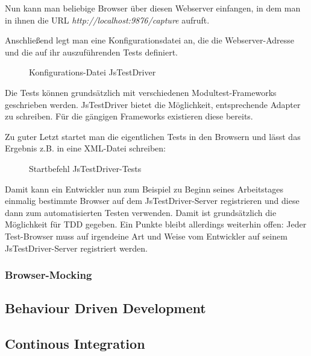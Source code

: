 Nun kann man beliebige Browser über diesen Webserver einfangen, in dem man in ihnen die URL \emph{http://localhost:9876/capture} aufruft.

Anschließend legt man eine Konfigurationsdatei an, die die Webserver-Adresse und die auf ihr auszuführenden Tests definiert.

\begin{figure}[H]
	\begin{center}
		\caption{Konfigurations-Datei JsTestDriver}
		\label{config:jstestdriver}
	\end{center}
\end{figure}

Die Tests können grundsätzlich mit verschiedenen Modultest-Frameworks geschrieben werden. JsTestDriver bietet die Möglichkeit, entsprechende Adapter zu schreiben. Für die gängigen Frameworks existieren diese bereits.

Zu guter Letzt startet man die eigentlichen Tests in den Browsern und lässt das Ergebnis z.B. in eine XML-Datei schreiben:

\begin{figure}[H]
	\begin{center}
		\caption{Startbefehl JsTestDriver-Tests}
		\label{bash:jstestdriver2}
	\end{center}
\end{figure}

Damit kann ein Entwickler nun zum Beispiel zu Beginn seines Arbeitstages einmalig bestimmte Browser auf dem JsTestDriver-Server registrieren und diese dann zum automatisierten Testen verwenden. Damit ist grundsätzlich die Möglichkeit für \ac{TDD} gegeben. Ein Punkte bleibt allerdings weiterhin offen: Jeder Test-Browser muss auf irgendeine Art und Weise vom Entwickler auf seinem JsTestDriver-Server registriert werden.

\subsubsection{Browser-Mocking}

\subsection{Behaviour Driven Development}

\subsection{Continous Integration}

